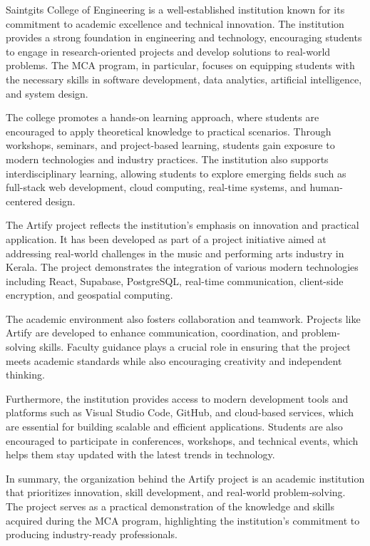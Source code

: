 \documentclass[12pt,a4paper]{report}
\begin{document}
Saintgits College of Engineering is a well-established institution known for its commitment to academic excellence and technical innovation. The institution provides a strong foundation in engineering and technology, encouraging students to engage in research-oriented projects and develop solutions to real-world problems. The MCA program, in particular, focuses on equipping students with the necessary skills in software development, data analytics, artificial intelligence, and system design.

The college promotes a hands-on learning approach, where students are encouraged to apply theoretical knowledge to practical scenarios. Through workshops, seminars, and project-based learning, students gain exposure to modern technologies and industry practices. The institution also supports interdisciplinary learning, allowing students to explore emerging fields such as full-stack web development, cloud computing, real-time systems, and human-centered design.

The Artify project reflects the institution's emphasis on innovation and practical application. It has been developed as part of a project initiative aimed at addressing real-world challenges in the music and performing arts industry in Kerala. The project demonstrates the integration of various modern technologies including React, Supabase, PostgreSQL, real-time communication, client-side encryption, and geospatial computing.

The academic environment also fosters collaboration and teamwork. Projects like Artify are developed to enhance communication, coordination, and problem-solving skills. Faculty guidance plays a crucial role in ensuring that the project meets academic standards while also encouraging creativity and independent thinking.

Furthermore, the institution provides access to modern development tools and platforms such as Visual Studio Code, GitHub, and cloud-based services, which are essential for building scalable and efficient applications. Students are also encouraged to participate in conferences, workshops, and technical events, which helps them stay updated with the latest trends in technology.

In summary, the organization behind the Artify project is an academic institution that prioritizes innovation, skill development, and real-world problem-solving. The project serves as a practical demonstration of the knowledge and skills acquired during the MCA program, highlighting the institution's commitment to producing industry-ready professionals.
\end{document}
